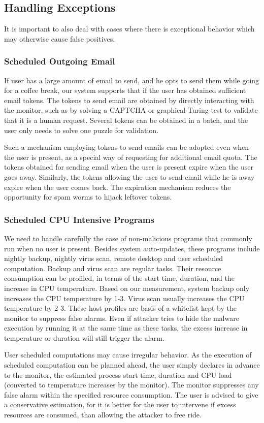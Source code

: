 \subsection{Handling Exceptions}

It is important to also deal with cases where there is exceptional
behavior which may otherwise cause false positives.

\subsubsection{Scheduled Outgoing Email}
If user has a large amount of email to send, and he opts to send them while going for a coffee break, our system supports that if the user has obtained sufficient email tokens. 
The tokens to send email are obtained by directly interacting with the monitor,
such as by solving a CAPTCHA \cite{von2003captcha} or graphical Turing test
to validate that it is a human request.
Several tokens can be obtained in a batch, and the user only needs to solve one puzzle for validation.

Such a mechanism employing tokens to send emails can be adopted even when 
the user is present, as a special way of requesting for additional email quota. The tokens obtained for sending email when the user is present expire when 
the user goes away. 
Similarly, the tokens allowing the user to send email while he is away expire when the user comes back. The expiration mechanism reduces the opportunity 
for spam worms to hijack leftover tokens.

\subsubsection{Scheduled CPU Intensive Programs}
We need to handle carefully the case of non-malicious programs that commonly
run when no user is present. Besides system auto-updates, these
programs include nightly backup, nightly virus scan, remote desktop
and user scheduled computation. Backup and virus scan are regular
tasks. Their resource consumption can be profiled, in terms of the
start time, duration, and the increase in CPU temperature. Based on
our measurement, system backup only increases the CPU temperature by
1-3\degree. Virus scan usually increases the CPU temperature by
2-3\degree. These host profiles are basis of a whitelist kept by
the monitor to suppress false alarms. Even if attacker tries to hide
the malware execution by running it at the same time as these tasks,
the excess increase in temperature or duration will still trigger
the alarm.

User scheduled computations may cause irregular behavior.
As the execution of scheduled computation can be planned ahead, the
user simply declares in advance to the monitor, the estimated process
start time, duration and CPU load
(converted to temperature increases by the monitor).
The monitor suppresses any
false alarm within the specified resource consumption. The user is
advised to give a conservative estimation, for it is better for the
user to intervene if excess resources are consumed, than allowing
the attacker to free ride. 
